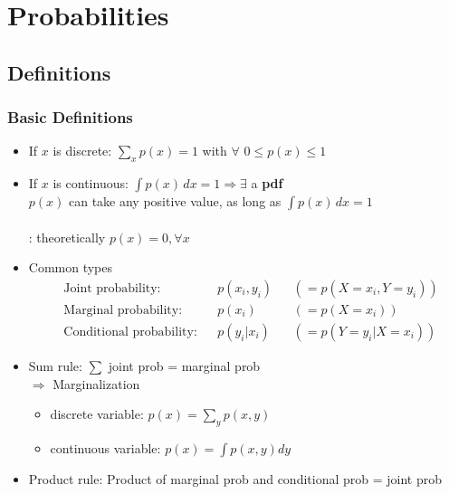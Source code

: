 \chapter{Probabilities}
\label{cha:probabilities}

\section{Definitions}
\label{sec:prob-defs}

\subsection{Basic Definitions}
\begin{itemize}
	\item If $x$ is discrete: $\underset{x}{\sum} p(x) = 1$ with $\forall$ $0 \leq p(x) \leq 1$
	\item If $x$ is continuous: $\displaystyle \int p(x) \,dx = 1 \Rightarrow \exists$ a \textbf{\ac{pdf}}\\
	$p(x)$ can take any positive value, as long as \(\displaystyle \int p(x) \,dx = 1\)\\
	\\
	\note: theoretically $p(x) = 0, \forall x$
	\item Common types
	\begin{align*}
		& \text{Joint probability:} 		&& p(x_i, y_i) 	&& \left(= p(X=x_i, Y=y_i)\right) \\
		& \text{Marginal probability:} 		&& p(x_i) 		&& \left(= p(X=x_i)\right) \\
		& \text{Conditional probability:} 	&& p(y_i | x_i) && \left(= p(Y=y_i|X=x_i)\right)
	\end{align*}	
	\item Sum rule: $\displaystyle \sum$ joint \ac{prob} = marginal \ac{prob}\\
	$\Rightarrow$ Marginalization	
	\begin{itemize}
		\item discrete variable: $\displaystyle p(x)=\underset{y}{\sum} p(x, y)$
		\item continuous variable: $\displaystyle p(x) = \int p(x,y) dy$
	\end{itemize}
	\item Product rule: Product of marginal \ac{prob} and conditional \ac{prob} = joint \ac{prob}
\end{itemize}

